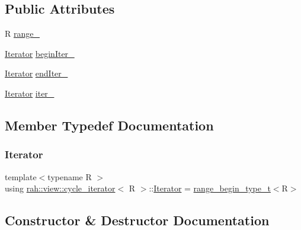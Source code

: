 \subsection*{Public Attributes}
\begin{DoxyCompactItemize}
\item 
R \mbox{\hyperlink{structrah_1_1view_1_1cycle__iterator_ad82f54467048a95f8e8f05e5a78afb48}{range\+\_\+}}
\item 
\mbox{\hyperlink{structrah_1_1view_1_1cycle__iterator_ac9761016862e6bb26b0ca5e923344b83}{Iterator}} \mbox{\hyperlink{structrah_1_1view_1_1cycle__iterator_a1daddc1b5ce6e1203aecb236a04d11d6}{begin\+Iter\+\_\+}}
\item 
\mbox{\hyperlink{structrah_1_1view_1_1cycle__iterator_ac9761016862e6bb26b0ca5e923344b83}{Iterator}} \mbox{\hyperlink{structrah_1_1view_1_1cycle__iterator_ac2b991834504ffc79a0d477588a4668e}{end\+Iter\+\_\+}}
\item 
\mbox{\hyperlink{structrah_1_1view_1_1cycle__iterator_ac9761016862e6bb26b0ca5e923344b83}{Iterator}} \mbox{\hyperlink{structrah_1_1view_1_1cycle__iterator_a49dea5baf32f7e9bc237b6f534513ada}{iter\+\_\+}}
\end{DoxyCompactItemize}


\subsection{Member Typedef Documentation}
\mbox{\label{structrah_1_1view_1_1cycle__iterator_ac9761016862e6bb26b0ca5e923344b83}} 
\subsubsection{\texorpdfstring{Iterator}{Iterator}}
{\footnotesize\ttfamily template$<$typename R $>$ \\
using \mbox{\hyperlink{structrah_1_1view_1_1cycle__iterator}{rah\+::view\+::cycle\+\_\+iterator}}$<$ R $>$\+::\mbox{\hyperlink{structrah_1_1view_1_1cycle__iterator_ac9761016862e6bb26b0ca5e923344b83}{Iterator}} =  \mbox{\hyperlink{namespacerah_a28aff4eeddcece6be65ff0b956d32d4a}{range\+\_\+begin\+\_\+type\+\_\+t}}$<$R$>$}



\subsection{Constructor \& Destructor Documentation}
\mbox{\label{structrah_1_1view_1_1cycle__iterator_a69b737bdbd97194bb5cfc0470fd60e58}} 
